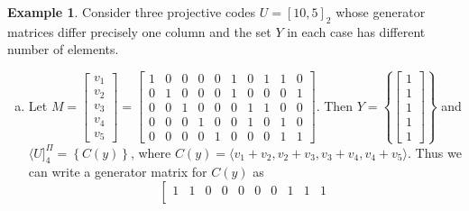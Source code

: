 \documentclass[12pt]{article}
\theoremstyle{definition}
\newtheorem{exmp}{Example}
\begin{document}
\begin{exmp}
  Consider three projective codes $U=[10, 5]_2$ whose generator matrices differ precisely one column and the set $Y$ in each case has different number of elements.
  \begin{enumerate}[a)]
    \item Let $M=\left[\begin{matrix}
                                                        v_1 \\
                                                        v_2 \\
                                                        v_3 \\
                                                        v_4 \\
                                                        v_5
                                                      \end{matrix}\right]=\left[\begin{matrix}
                   1 & 0 & 0 & 0 & 0 & 1 & 0 & 1 & 1 & 0 \\
                   0& 1  & 0 & 0 & 0 & 1 & 0 & 0 & 0 & 1 \\
                   0 & 0 & 1 & 0 & 0 & 0 & 1 & 1 & 0& 0\\
                   0 & 0 & 0 & 1 & 0 & 0 & 1 & 0 & 1 & 0 \\
                   0 & 0 & 0 & 0 & 1 & 0 & 0 & 0 & 1 & 1
                 \end{matrix}\right].$ Then $Y=\left\{\left[\begin{matrix}
                                                        1 \\
                                                        1 \\
                                                        1 \\
                                                        1 \\
                                                        1
                                                      \end{matrix}\right]\right\}$ and $\langle U]^{\Pi}_{4}=\left\{C(y)\right\}$, where $C(y)=\langle v_1+v_2, v_2+v_3, v_3+v_4, v_4+v_5\rangle.$ Thus we can write a generator matrix for $C(y)$ as
                                                      $$\left[\begin{matrix}
                   1 & 1 & 0 & 0 & 0 & 0 & 0 & 1 & 1 & 1 \\

\end{matrix}$$
\end{enumerate}
\end{exmp}
\end{document}

